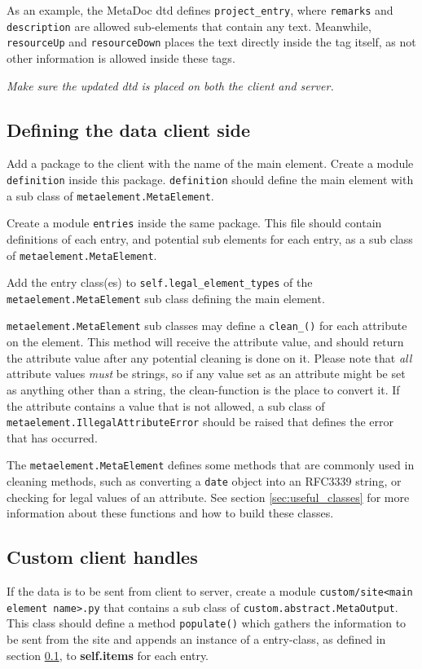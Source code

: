 As an example, the MetaDoc \gls{dtd} \cite{metadoc_dtd} defines
\texttt{project\_entry}, where \texttt{remarks} and \texttt{description} are
allowed sub-elements that contain any text. Meanwhile, \texttt{resourceUp} and
\texttt{resourceDown} places the text directly inside the tag itself, as not
other information is allowed inside these tags.

\textit{Make sure the updated \gls{dtd} is placed on both the client and
server.}

\subsection{Defining the data client side}
\label{sec:defclientmodel}
Add a package \cite{python_modules} to the client with the name of the main
element. Create a module \texttt{definition} inside this package.
\texttt{definition} should define the main element with a sub class of
\texttt{metaelement.MetaElement}.

Create a module \texttt{entries} inside the same package. This file should
contain definitions of each entry, and potential sub elements for each entry,
as a sub class of \texttt{metaelement.MetaElement}. 

Add the entry class(es) to \texttt{self.legal\_element\_types} of the \\ 
\texttt{metaelement.MetaElement} sub class defining the main element. 

\texttt{metaelement.MetaElement} sub classes may define a
\texttt{clean\_<attribute name>()} for each attribute on the element. This
method will receive the attribute value, and should return the attribute value
after any potential cleaning is done on it. Please note that \textit{all}
attribute values \textit{must} be strings, so if any value set as an attribute
might be set as anything other than a string, the clean-function is the place
to convert it. If the attribute contains a value that is not allowed, a sub
class of \texttt{metaelement.IllegalAttributeError} should be raised that
defines the error that has occurred. 

The \texttt{metaelement.MetaElement} defines some methods that are commonly
used in cleaning methods, such as converting a \texttt{date} object into an
RFC3339 string, or checking for legal values of an attribute. See section
\ref{sec:useful_classes} for more information about these functions and how to
build these classes.

\subsection{Custom client handles}
If the data is to be sent from client to server, create a module
\texttt{custom/site<main element name>.py} that contains a sub class of
\texttt{custom.abstract.MetaOutput}. This class should define a method
\texttt{populate()} which gathers the information to be sent from the site and
appends an instance of a entry-class, as defined in section
\ref{sec:defclientmodel}, to \textbf{self.items} for each entry.


